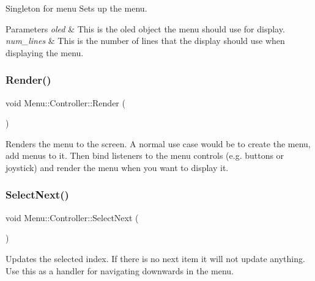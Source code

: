Singleton for menu Sets up the menu. 
\begin{DoxyParams}{Parameters}
{\em oled} & This is the oled object the menu should use for display. \\
\hline
{\em num\+\_\+lines} & This is the number of lines that the display should use when displaying the menu. \\
\hline
\end{DoxyParams}
\hypertarget{class_menu_1_1_controller_af46abb3d242c76822c0e8ea8ab777fa5}{}\label{class_menu_1_1_controller_af46abb3d242c76822c0e8ea8ab777fa5} 
\subsubsection{\texorpdfstring{Render()}{Render()}}
{\footnotesize\ttfamily void Menu\+::\+Controller\+::\+Render (\begin{DoxyParamCaption}{ }\end{DoxyParamCaption})}

Renders the menu to the screen. A normal use case would be to create the menu, add menus to it. Then bind listeners to the menu controls (e.\+g. buttons or joystick) and render the menu when you want to display it. \hypertarget{class_menu_1_1_controller_a9aabc6ba652c29efa7a02e12f51ce0b1}{}\label{class_menu_1_1_controller_a9aabc6ba652c29efa7a02e12f51ce0b1} 
\subsubsection{\texorpdfstring{Select\+Next()}{SelectNext()}}
{\footnotesize\ttfamily void Menu\+::\+Controller\+::\+Select\+Next (\begin{DoxyParamCaption}{ }\end{DoxyParamCaption})}

Updates the selected index. If there is no next item it will not update anything. Use this as a handler for navigating downwards in the menu. \hypertarget{class_menu_1_1_controller_a04e3448cfe4341ad7209a9f16bbcb449}{}\label{class_menu_1_1_controller_a04e3448cfe4341ad7209a9f16bbcb449} 
